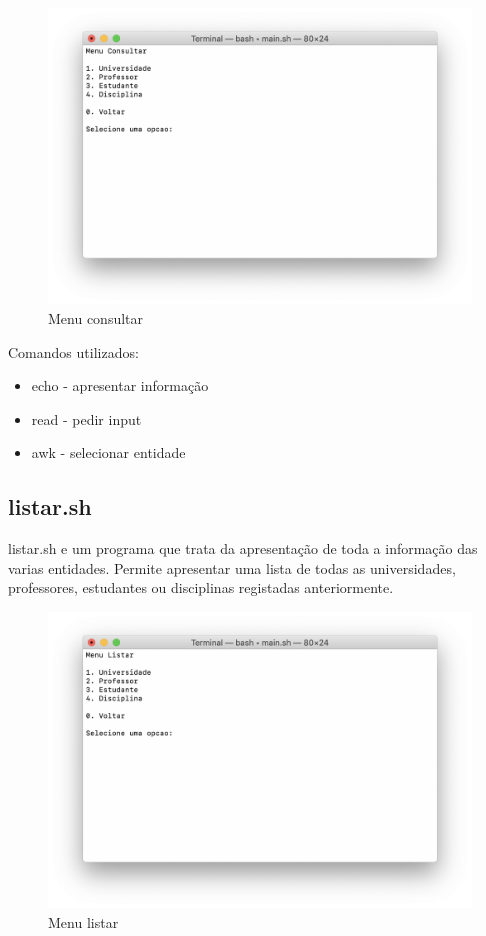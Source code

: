 \documentclass{article}
\begin{document}
\begin{figure}[h]
\centering
\includegraphics[scale=0.4]{images/MenuConsultar}
\caption{Menu consultar}
\end{figure}

Comandos utilizados:

\begin{itemize}
\item echo - apresentar informação
\item read - pedir input
\item awk - selecionar entidade
\end{itemize}

\pagebreak{}
\subsection{listar.sh}
\label{sec:org4ba6c40}

listar.sh e um programa que trata da apresentação de toda a informação das varias entidades.
Permite apresentar uma lista de todas as universidades, professores, estudantes ou disciplinas registadas anteriormente.

\begin{figure}[h]
\centering
\includegraphics[scale=0.4]{images/MenuListar}
\caption{Menu listar}
\end{figure}
\end{document}

